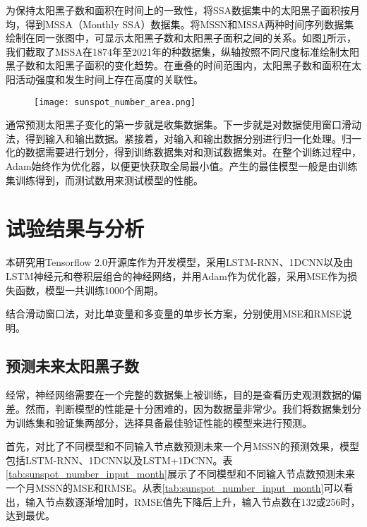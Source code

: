 为保持太阳黑子数和面积在时间上的一致性，将SSA数据集中的太阳黑子面积按月均，得到MSSA（Monthly SSA）数据集。将MSSN和MSSA两种时间序列数据集绘制在同一张图中，可显示太阳黑子数和太阳黑子面积之间的关系。如图\ref{fig:sunspot_number_area}所示，我们截取了MSSA在1874年至2021年的种数据集，纵轴按照不同尺度标准绘制太阳黑子数和太阳黑子面积的变化趋势。在重叠的时间范围内，太阳黑子数和面积在太阳活动强度和发生时间上存在高度的关联性。

\begin{figure}[!htbp]
  \centering
  \texttt{[image: sunspot\_number\_area.png]}
  \vspace{-1cm}
  \label{fig:sunspot_number_area}
\end{figure}

通常预测太阳黑子变化的第一步就是收集数据集。下一步就是对数据使用窗口滑动法，得到输入和输出数据。紧接着，对输入和输出数据分别进行归一化处理。归一化的数据需要进行划分，得到训练数据集对和测试数据集对。在整个训练过程中，Adam始终作为优化器，以便更快获取全局最小值。产生的最佳模型一般是由训练集训练得到，而测试数用来测试模型的性能。

\section{试验结果与分析}

本研究用Tensorflow 2.0开源库作为开发模型，采用LSTM-RNN、1DCNN以及由LSTM神经元和卷积层组合的神经网络，并用Adam作为优化器，采用MSE作为损失函数，模型一共训练1000个周期。

结合滑动窗口法，对比单变量和多变量的单步长方案，分别使用MSE和RMSE说明。

\subsection{预测未来太阳黑子数}\label{sec:ss_result_number}

经常，神经网络需要在一个完整的数据集上被训练，目的是查看历史观测数据的偏差。然而，判断模型的性能是十分困难的，因为数据量非常少。我们将数据集划分为训练集和验证集两部分，选择具备最佳验证性能的模型来进行预测。

首先，对比了不同模型和不同输入节点数预测未来一个月MSSN的预测效果，模型包括LSTM-RNN、1DCNN以及LSTM+1DCNN。表\ref{tab:sunspot_number_input_month}展示了不同模型和不同输入节点数预测未来一个月MSSN的MSE和RMSE。从表\ref{tab:sunspot_number_input_month}可以看出，输入节点数逐渐增加时，RMSE值先下降后上升，输入节点数在132或256时，达到最优。

